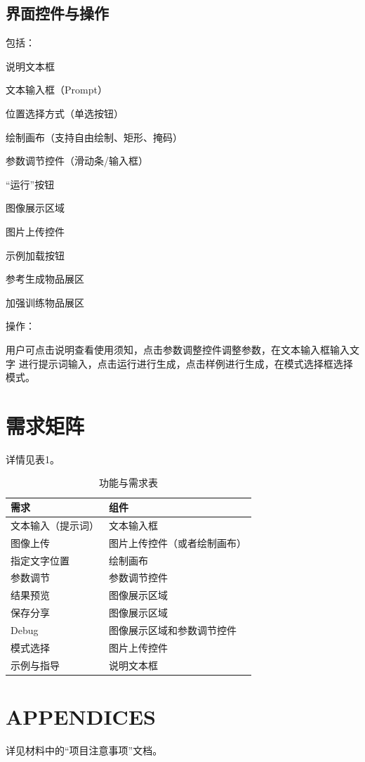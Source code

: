 \documentclass[a4paper,12pt]{ctexart}  %
\begin{document}
\subsection{界面控件与操作}
\noindent 包括：

说明文本框

文本输入框（Prompt）

位置选择方式（单选按钮）

绘制画布（支持自由绘制、矩形、掩码）

参数调节控件（滑动条/输入框）

“运行”按钮

图像展示区域

图片上传控件

示例加载按钮

参考生成物品展区

加强训练物品展区

\noindent 操作：

用户可点击说明查看使用须知，点击参数调整控件调整参数，在文本输入框输入文字
进行提示词输入，点击运行进行生成，点击样例进行生成，在模式选择框选择模式。
\section{需求矩阵}
详情见表1。
\begin{table}[htbp]
    \centering
    \begin{tabular}{|p{4cm}|p{10cm}|}
      \hline
      \textbf{需求} & \textbf{组件} \\
      \hline
      文本输入（提示词）
        & 文本输入框 \\
      \hline
      图像上传
        &  图片上传控件（或者绘制画布）\\
      \hline
      指定文字位置 
        & 绘制画布 \\
      \hline
      参数调节
        & 参数调节控件 \\
      \hline
      结果预览
        & 图像展示区域 \\
      \hline
      保存分享
        & 图像展示区域 \\
      \hline
      Debug
        & 图像展示区域和参数调节控件 \\
      \hline
      模式选择
        & 图片上传控件 \\
      \hline
      示例与指导
        & 说明文本框 \\
      \hline
    \end{tabular}
    \caption{功能与需求表}
\end{table}
  

\section{APPENDICES}
详见材料中的“项目注意事项”文档。
\end{document}
